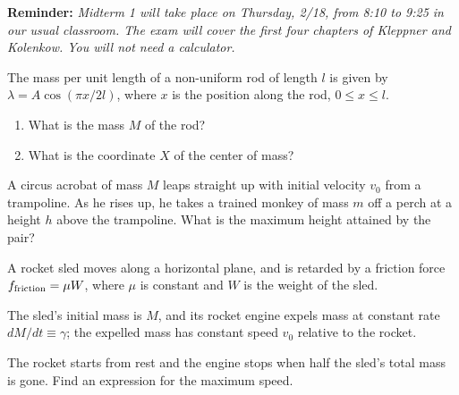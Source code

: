 \documentclass[12pt,letterpaper]{hmcpset}
\begin{document}


\textbf{Reminder:} \textsl{Midterm 1 will take place on Thursday, 2/18, from 8:10 to
9:25 in our usual classroom. The exam will cover the first four chapters of
Kleppner and Kolenkow. You will not need a calculator.}

\begin{problem}
    The mass per unit length of a non-uniform
    rod of length $l$ is given by $\lambda = 
    A \cos(\pi x/2 l)$, where $x$ is the 
    position along the rod, $0 \le x \le l$.

    \begin{enumerate}
    \item What is the mass $M$ of the rod?
    \item What is the coordinate $X$ of the center of mass?
    \end{enumerate}
\end{problem}
\begin{solution}
    \vfill
\end{solution}

\clearpage


\begin{problem}
  A circus acrobat of mass $M$ leaps 
  straight up with initial velocity $v_{0}$
  from a trampoline. As he rises up, he 
  takes a trained monkey of mass $m$ off a
  perch at a height $h$ above the trampoline. 
  What is the maximum height attained by the pair?
\end{problem}
\begin{solution}
    \vfill
\end{solution}

\clearpage


\begin{problem}
  A rocket sled moves along a horizontal plane, and is retarded by a friction
  force $f_{\rm friction} = \mu W$, where $\mu$ is constant and $W$ is the
  weight of the sled.

  The sled's initial mass is $M$, and its rocket engine expels mass at constant
  rate $dM/dt \equiv \gamma$; the expelled mass has constant speed $v_{0}$
  relative to the rocket.

  The rocket starts from rest and the engine stops when half the sled's total
  mass is gone. Find an expression for the maximum speed.
\end{problem}
\begin{solution}
    \vfill
\end{solution}
\end{document}
